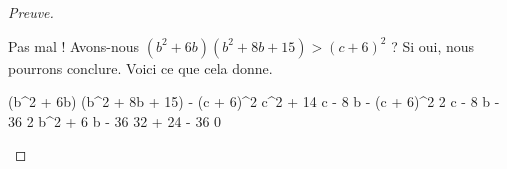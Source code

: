 \begin{proof}[Preuve]
\begin{itemize}
        \smallskip
        \noindent
        Pas mal ! Avons-nous $(b^2 + 6b) (b^2 + 8b + 15) > (c + 6)^2$ ? Si oui, nous pourrons conclure. Voici ce que cela donne.
    
        \medskip
        \noindent\kern-10pt%
        \begin{stepcalc}[style = ar*]
        	(b^2 + 6b) (b^2 + 8b + 15) - (c + 6)^2
        \explnext{}
        	c^2 + 14 c - 8 b - (c + 6)^2
        \explnext{}
        	2 c - 8 b - 36
        \explnext{}
        	2 b^2 + 6 b - 36
        	32 + 24 - 36
        \explnext[>]{}
        	0
        \end{stepcalc}
    \end{itemize}
    
    \vspace{-2ex}	
    \leavevmode
\end{proof}
